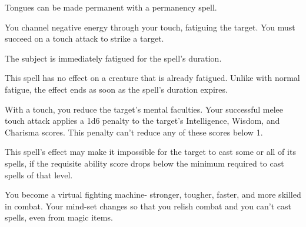 \begin{multicols}{2}
\begin{small}
\smallskip\noindent Tongues can be made permanent with a permanency spell.


\noindent You channel negative energy through your touch, fatiguing the target. You must succeed on a touch attack to strike a target.

\smallskip\noindent The subject is immediately fatigued for the spell's duration.

\smallskip\noindent This spell has no effect on a creature that is already fatigued. Unlike with normal fatigue, the effect ends as soon as the spell's duration expires.


\noindent With a touch, you reduce the target's mental faculties. Your successful melee touch attack applies a 1d6 penalty to the target's Intelligence, Wisdom, and Charisma scores. This penalty can't reduce any of these scores below 1.

\smallskip\noindent This spell's effect may make it impossible for the target to cast some or all of its spells, if the requisite ability score drops below the minimum required to cast spells of that level.

\noindent You become a virtual fighting machine- stronger, tougher, faster, and more skilled in combat. Your mind-set changes so that you relish combat and you can't cast spells, even from magic items.


\end{small}
\end{multicols}
